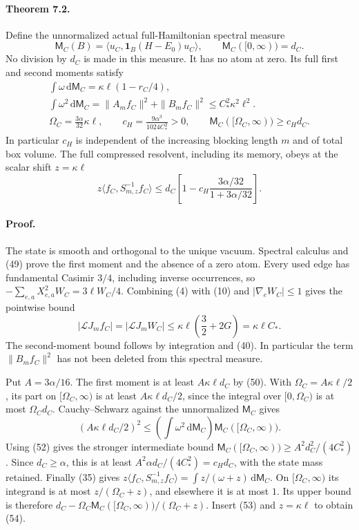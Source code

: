 \documentclass[11pt]{article}
\newcommand{\dd}{\,\mathrm d}
\newcommand{\LL}{\mathscr L}
\begin{document}
\paragraph{Theorem 7.2.}
Define the unnormalized actual full-Hamiltonian spectral measure
\begin{equation}\label{eq:nu}
 \mathsf M_C(B)=\langle u_C,\mathbf1_B(H-E_0)u_C\rangle,\qquad
 \mathsf M_C([0,\infty))=d_C.
\end{equation}
No division by $d_C$ is made in this measure. It has no atom at zero.
Its full first and second moments satisfy
\begin{gather}
 \int\omega\dd\mathsf M_C=\kappa\ell(1-r_C/4),\nonumber\\
 \int\omega^2\dd\mathsf M_C
 =\|A_mf_C\|^2+\|B_mf_C\|^2
 \leq C_*^2\kappa^2\ell^2.\label{eq:moments}\\
 \Omega_C=\frac{3\alpha}{32}\kappa\ell,\qquad
 c_H=\frac{9\alpha^3}{1024C_*^2}>0,\qquad
 \boxed{\mathsf M_C([\Omega_C,\infty))\geq c_Hd_C.}\label{eq:highweight}
\end{gather}
In particular $c_H$ is independent of the increasing blocking length $m$
and of total box volume. The full compressed resolvent, including its
memory, obeys at the scalar shift $z=\kappa\ell$
\begin{equation}\label{eq:resolventdeficit}
 z\langle f_C,S_{m,z}^{-1}f_C\rangle
 \leq d_C\left[1-c_H\frac{3\alpha/32}{1+3\alpha/32}\right].
\end{equation}

\paragraph{Proof.}
The state is smooth and orthogonal to the unique vacuum. Spectral
calculus and (49) prove the first moment and the
absence of a zero atom. Every used edge has fundamental Casimir $3/4$,
including inverse occurrences, so
$-\sum_{e,a}X_{e,a}^2W_C=3\ell W_C/4$.
Combining (4) with (10) and
$|\nabla_e W_C|\leq1$ gives the pointwise bound
\[
 |\LL J_mf_C|=|\LL J_mW_C|
 \leq\kappa\ell\left(\frac32+2G\right)=\kappa\ell C_*.
\]
The second-moment bound follows by integration and
(40). In particular the term $\|B_mf_C\|^2$ has not been
deleted from this spectral measure.

Put $A=3\alpha/16$. The first moment is at least $A\kappa\ell d_C$
by (50). With $\Omega_C=A\kappa\ell/2$, its part on
$[\Omega_C,\infty)$ is at least $A\kappa\ell d_C/2$, since the integral
over $[0,\Omega_C)$ is at most $\Omega_C d_C$.
Cauchy--Schwarz against the unnormalized $\mathsf M_C$ gives
\[
 (A\kappa\ell d_C/2)^2
 \leq\left(\int\omega^2\dd\mathsf M_C\right)
                       \mathsf M_C([\Omega_C,\infty)).
\]
Using (52) gives the stronger intermediate bound
$\mathsf M_C([\Omega_C,\infty))\geq A^2d_C^2/(4C_*^2)$.
Since $d_C\geq\alpha$, this is at least
$A^2\alpha d_C/(4C_*^2)=c_Hd_C$, with the state mass retained.
Finally (35) gives
$z\langle f_C,S_{m,z}^{-1}f_C\rangle
=\int z/(\omega+z)\dd\mathsf M_C$.
On $[\Omega_C,\infty)$ its integrand is at most
$z/(\Omega_C+z)$, and elsewhere it is at most $1$.
Its upper bound is therefore
$d_C-\Omega_C\mathsf M_C([\Omega_C,\infty))/(\Omega_C+z)$.
Insert (53) and $z=\kappa\ell$ to obtain
(54).
\end{document}
